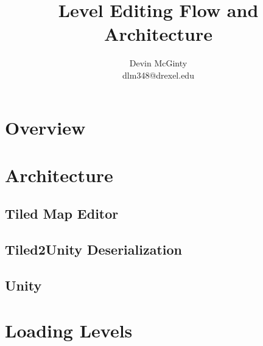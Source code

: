 \documentclass{article}
\title{Level Editing Flow and Architecture}
\author{
    \large
    Devin McGinty\\
    \normalsize
    dlm348@drexel.edu
}
\begin{document}
\maketitle

\tableofcontents
\newpage

\section{Overview}

\section{Architecture}
\subsection{Tiled Map Editor}
\subsection{Tiled2Unity Deserialization}
\subsection{Unity}

\section{Loading Levels}
\end{document}

